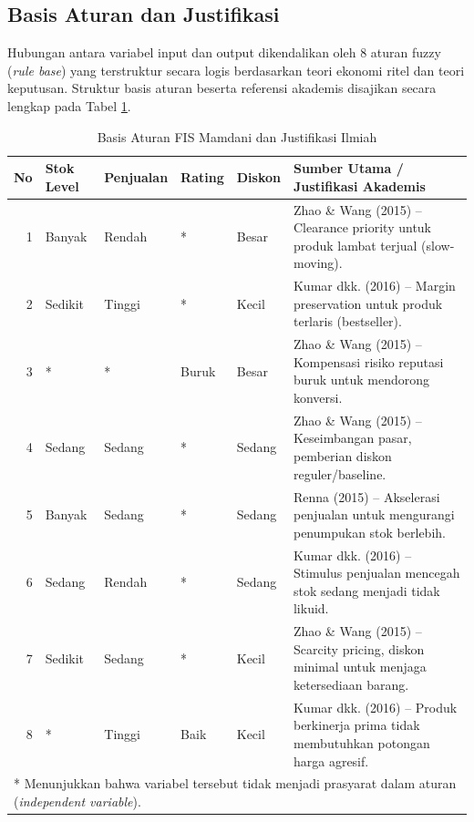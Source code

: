 \documentclass[conference]{IEEEtran}
\begin{document}
\subsection{Basis Aturan dan Justifikasi}
Hubungan antara variabel input dan output dikendalikan oleh 8 aturan fuzzy (\textit{rule base}) yang terstruktur secara logis berdasarkan teori ekonomi ritel dan teori keputusan. Struktur basis aturan beserta referensi akademis disajikan secara lengkap pada Tabel \ref{tab:rules}.

\begin{table}[t]
\caption{Basis Aturan FIS Mamdani dan Justifikasi Ilmiah}
\label{tab:rules}
\centering
\begin{tabular}{rllllp{5.5cm}}
\toprule
\textbf{No} & \textbf{Stok Level} & \textbf{Penjualan} & \textbf{Rating} & \textbf{Diskon} & \textbf{Sumber Utama / Justifikasi Akademis} \\
\midrule
1 & Banyak & Rendah & * & Besar & Zhao \& Wang (2015) \cite{zhao2015} -- Clearance priority untuk produk lambat terjual (slow-moving). \\
2 & Sedikit & Tinggi & * & Kecil & Kumar dkk. (2016) \cite{kumar2016} -- Margin preservation untuk produk terlaris (bestseller). \\
3 & * & * & Buruk & Besar & Zhao \& Wang (2015) \cite{zhao2015} -- Kompensasi risiko reputasi buruk untuk mendorong konversi. \\
4 & Sedang & Sedang & * & Sedang & Zhao \& Wang (2015) \cite{zhao2015} -- Keseimbangan pasar, pemberian diskon reguler/baseline. \\
5 & Banyak & Sedang & * & Sedang & Renna (2015) \cite{renna2015} -- Akselerasi penjualan untuk mengurangi penumpukan stok berlebih. \\
6 & Sedang & Rendah & * & Sedang & Kumar dkk. (2016) \cite{kumar2016} -- Stimulus penjualan mencegah stok sedang menjadi tidak likuid. \\
7 & Sedikit & Sedang & * & Kecil & Zhao \& Wang (2015) \cite{zhao2015} -- Scarcity pricing, diskon minimal untuk menjaga ketersediaan barang. \\
8 & * & Tinggi & Baik & Kecil & Kumar dkk. (2016) \cite{kumar2016} -- Produk berkinerja prima tidak membutuhkan potongan harga agresif. \\
\bottomrule
\multicolumn{6}{l}{* Menunjukkan bahwa variabel tersebut tidak menjadi prasyarat dalam aturan (\textit{independent variable}).}
\end{tabular}
\end{table}
\end{document}

